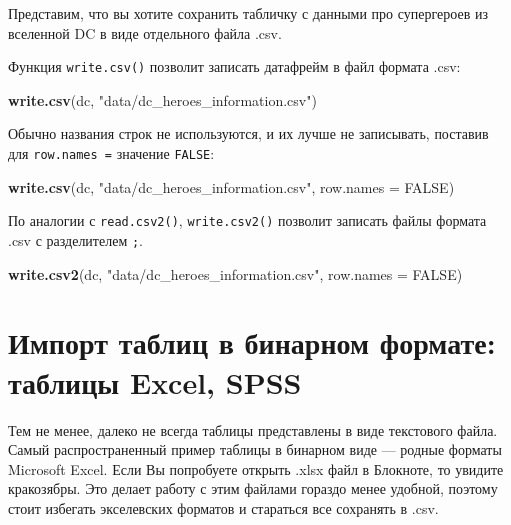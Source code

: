 \documentclass[]{book}
\newenvironment{Shaded}{\begin{snugshade}}{\end{snugshade}}
\newcommand{\KeywordTok}[1]{\textcolor[rgb]{0.13,0.29,0.53}{\textbf{#1}}}
\newcommand{\DataTypeTok}[1]{\textcolor[rgb]{0.13,0.29,0.53}{#1}}
\newcommand{\StringTok}[1]{\textcolor[rgb]{0.31,0.60,0.02}{#1}}
\newcommand{\OtherTok}[1]{\textcolor[rgb]{0.56,0.35,0.01}{#1}}
\newcommand{\OperatorTok}[1]{\textcolor[rgb]{0.81,0.36,0.00}{\textbf{#1}}}
\newcommand{\NormalTok}[1]{#1}
\begin{document}
Представим, что вы хотите сохранить табличку с данными про супергероев
из вселенной DC в виде отдельного файла .csv.

\begin{Shaded}
\end{Shaded}

Функция \texttt{write.csv()} позволит записать датафрейм в файл формата
.csv:

\begin{Shaded}
\begin{Highlighting}[]
\KeywordTok{write.csv}\NormalTok{(dc, }\StringTok{"data/dc_heroes_information.csv"}\NormalTok{)}
\end{Highlighting}
\end{Shaded}

Обычно названия строк не используются, и их лучше не записывать,
поставив для \texttt{row.names\ =} значение \texttt{FALSE}:

\begin{Shaded}
\begin{Highlighting}[]
\KeywordTok{write.csv}\NormalTok{(dc, }\StringTok{"data/dc_heroes_information.csv"}\NormalTok{, }\DataTypeTok{row.names =} \OtherTok{FALSE}\NormalTok{)}
\end{Highlighting}
\end{Shaded}

По аналогии с \texttt{read.csv2()}, \texttt{write.csv2()} позволит
записать файлы формата .csv с разделителем \texttt{;}.

\begin{Shaded}
\begin{Highlighting}[]
\KeywordTok{write.csv2}\NormalTok{(dc, }\StringTok{"data/dc_heroes_information.csv"}\NormalTok{, }\DataTypeTok{row.names =} \OtherTok{FALSE}\NormalTok{)}
\end{Highlighting}
\end{Shaded}

\section{Импорт таблиц в бинарном формате: таблицы Excel,
SPSS}\label{binary}

Тем не менее, далеко не всегда таблицы представлены в виде текстового
файла. Самый распространенный пример таблицы в бинарном виде --- родные
форматы Microsoft Excel. Если Вы попробуете открыть .xlsx файл в
Блокноте, то увидите кракозябры. Это делает работу с этим файлами
гораздо менее удобной, поэтому стоит избегать экселевских форматов и
стараться все сохранять в .csv.
\end{document}
